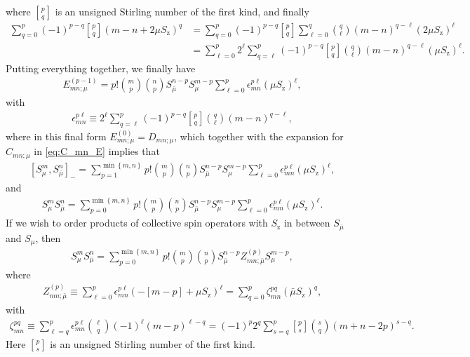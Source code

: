 \documentclass[pra,reprint,longbibliography]{revtex4-1}
\newcommand{\p}[1]{\left(#1\right)} %
\renewcommand{\sp}[1]{\left[#1\right]} %
\renewcommand{\set}[1]{\left\{#1\right\}} %
\newcommand{\z}{\text{z}}
\newcommand{\bmu}{{\bar\mu}}
\newcommand{\1}{\mathds{1}}
\begin{document}
where ${ p \brack q }$ is an unsigned Stirling number of the first
kind, and finally
\begin{align}
  \sum_{q=0}^p \p{-1}^{p-q} { p \brack q } \p{m-n+2\mu S_\z}^q
  &= \sum_{q=0}^p \p{-1}^{p-q} { p \brack q } \sum_{\ell=0}^q
  { q \choose \ell } \p{m-n}^{q-\ell} \p{2\mu S_\z}^\ell \\
  &= \sum_{\ell=0}^p 2^\ell \sum_{q=\ell}^p \p{-1}^{p-q}
  { p \brack q } { q \choose \ell } \p{m-n}^{q-\ell} \p{\mu S_\z}^\ell.
\end{align}
Putting everything together, we finally have
\begin{align}
  E_{mn;\mu}^{(p-1)}
  = p! { m \choose p } { n \choose p }
  S_\bmu^{n-p} S_\mu^{m-p}
  \sum_{\ell=0}^p \epsilon_{mn}^{p\ell} \p{\mu S_\z}^\ell,
\end{align}
with
\begin{align}
  \epsilon_{mn}^{p\ell}
  \equiv 2^\ell \sum_{q=\ell}^p \p{-1}^{p-q}
  { p \brack q } { q \choose \ell } \p{m-n}^{q-\ell},
\end{align}
where in this final form $E_{mn;\mu}^{(0)} = D_{mn;\mu}$, which
together with the expansion for $C_{mn;\mu}$ in \eqref{eq:C_mn_E}
implies that
\begin{align}
  \sp{S_\mu^m, S_\bmu^n}_-
  = \sum_{p=1}^{\min\set{m,n}}
  p! { m \choose p } { n \choose p } S_\bmu^{n-p} S_\mu^{m-p}
  \sum_{\ell=0}^p \epsilon_{mn}^{p\ell} \p{\mu S_\z}^\ell,
  \label{eq:comm_mu}
\end{align}
and
\begin{align}
  S_\mu^m S_\bmu^n
  = \sum_{p=0}^{\min\set{m,n}}
  p! { m \choose p } { n \choose p } S_\bmu^{n-p} S_\mu^{m-p}
  \sum_{\ell=0}^p \epsilon_{mn}^{p\ell} \p{\mu S_\z}^\ell.
  \label{eq:push_mu_bmu}
\end{align}
If we wish to order products of collective spin operators with $S_\z$
in between $S_\bmu$ and $S_\mu$, then
\begin{align}
  S_\mu^m S_\bmu^n
  = \sum_{p=0}^{\min\set{m,n}} p! { m \choose p } { n \choose p }
  S_\bmu^{n-p} Z_{mn;\bmu}^{(p)} S_\mu^{m-p},
\end{align}
where
\begin{align}
  Z_{mn;\bmu}^{(p)}
  \equiv \sum_{\ell=0}^p \epsilon_{mn}^{p\ell}
  \p{-\sp{m-p} + \mu S_\z}^\ell
  = \sum_{q=0}^p \zeta_{mn}^{pq} \p{\bmu S_\z}^q,
  \label{eq:Z_mnp}
\end{align}
with
\begin{align}
  \zeta_{mn}^{pq}
  \equiv \sum_{\ell=q}^p \epsilon_{mn}^{p\ell}
  { \ell \choose q } \p{-1}^\ell \p{m-p}^{\ell-q}
  = \p{-1}^p 2^q \sum_{s=q}^p
  { p \brack s } { s \choose q } \p{m+n-2p}^{s-q}.
  \label{eq:zeta_mnpq}
\end{align}
Here ${ p \brack s }$ is an unsigned Stirling number of the first
kind.
\end{document}
